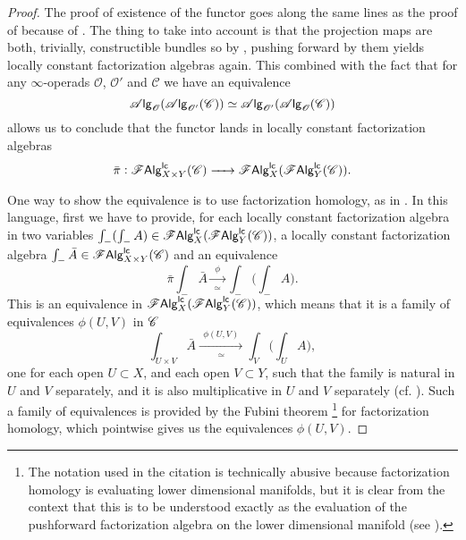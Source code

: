 \documentclass[../text.tex]{subfiles}
\begin{document}
\begin{proof}
    The proof of existence of the functor goes along the same lines as the proof of  because of . The thing to take into account is that the projection maps are both, trivially, constructible bundles so by , pushing forward by them yields locally constant factorization algebras again. This combined with the fact that for any $\infty$-operads $\mathscr{O}$, $\mathscr{O}'$ and $\mathscr{C}$ we have an equivalence
    \begin{equation}
        \mathscr{A} \mathsf{lg}_{\mathscr{O}} (\mathscr{A} \mathsf{lg}_{\mathscr{O}'} (\mathscr{C})) \simeq \mathscr{A} \mathsf{lg}_{\mathscr{O}'} (\mathscr{A} \mathsf{lg}_{\mathscr{O}} (\mathscr{C}))
    \end{equation}
    allows us to conclude that the functor lands in locally constant factorization algebras
    \begin{equation}
        \bar{\pi}: \mathscr{F} \mathsf{Alg}^{\mathsf{lc}}_{X \times Y}(\mathscr{C}) \xrightarrow{\ \ \ \ } \mathscr{F} \mathsf{Alg}^{\mathsf{lc}}_{X}(\mathscr{F} \mathsf{Alg}^{\mathsf{lc}}_{Y}(\mathscr{C})).
    \end{equation}

    One way to show the equivalence is to use factorization homology, as in . In this language, first we have to provide, for each locally constant factorization algebra in two variables $\int_{-}(\int_{-} A) \in \mathscr{F} \mathsf{Alg}^{\mathsf{lc}}_{X}(\mathscr{F} \mathsf{Alg}^{\mathsf{lc}}_{Y}(\mathscr{C}))$, a locally constant factorization algebra $\int_{-} \bar{A} \in \mathscr{F} \mathsf{Alg}^{\mathsf{lc}}_{X \times Y} (\mathscr{C})$ and an equivalence
    \begin{equation}
        \bar{\pi} \int_{-} \bar{A} \xrightarrow[\simeq]{\ \ \phi \ \ } \int_{-} \big( \int_{-} A \big).
    \end{equation}
    This is an equivalence in $\mathscr{F} \mathsf{Alg}^{\mathsf{lc}}_{X}(\mathscr{F} \mathsf{Alg}^{\mathsf{lc}}_{Y}(\mathscr{C}))$, which means that it is a family of equivalences $\phi(U,V)$ in $\mathscr{C}$
    \begin{equation}
        \int_{U \times V} \bar{A} \xrightarrow[\simeq]{\ \ \phi (U,V)\ \ } \int_{V} \big( \int_{U} A \big),
    \end{equation}
    one for each open $U \subset X$, and each open $V \subset Y$, such that the family is natural in $U$ and $V$ separately, and it is also multiplicative in $U$ and $V$ separately (cf. ). Such a family of equivalences is provided by the Fubini theorem \cite[cor.2.29]{aft_fhstrat}\footnote{The notation used in the citation is technically abusive because factorization homology is evaluating lower dimensional manifolds, but it is clear from the context that this is to be understood exactly as the evaluation of the pushforward factorization algebra on the lower dimensional manifold (see ).} for factorization homology, which pointwise gives us the equivalences $\phi(U,V)$. 
    

\end{proof}
\end{document}
